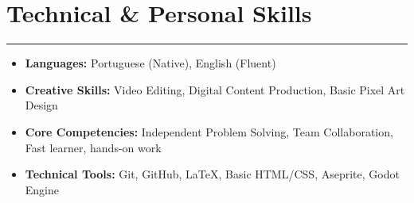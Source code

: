 \documentclass[10pt,a4paper]{article}
\begin{document}
\vspace{3mm}


\section*{Technical \& Personal Skills}
\hrule \vspace{1mm}
\begin{itemize}
    \item \textbf{Languages:} Portuguese (Native), English (Fluent)
    \item \textbf{Creative Skills:} Video Editing, Digital Content Production, Basic Pixel Art Design
    \item \textbf{Core Competencies:} Independent Problem Solving, Team Collaboration, Fast learner, hands-on work
    \item \textbf{Technical Tools:} Git, GitHub, LaTeX, Basic HTML/CSS, Aseprite, Godot Engine
\end{itemize}
\end{document}
